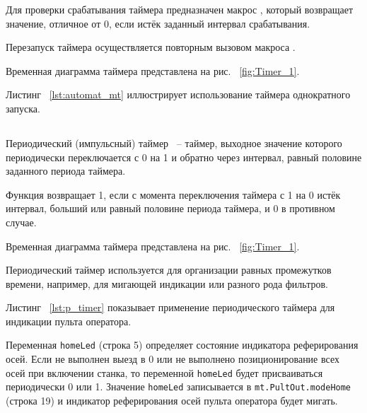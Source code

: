 Для проверки срабатывания таймера предназначен макрос , который возвращает значение, отличное от 0, если истёк заданный интервал срабатывания.

Перезапуск таймера осуществляется повторным вызовом макроса .

Временная диаграмма таймера представлена на рис. ~\ref{fig:Timer_1}.


Листинг ~\ref{lst:automat_mt} иллюстрирует использование таймера однократного запуска.


\subsection{}

Периодический (импульсный) таймер ~-- таймер, выходное значение которого периодически переключается с 0 на 1 и обратно через интервал, равный половине заданного периода таймера.

Функция  возвращает 1, если с момента переключения таймера с 1 на 0 истёк интервал, больший или равный половине периода таймера, и 0 в противном случае. 

Временная диаграмма таймера представлена на рис. ~\ref{fig:Timer_1}.


Периодический таймер используется для организации равных промежутков времени, например, для мигающей индикации или разного рода фильтров.

Листинг ~\ref{lst:p_timer} показывает применение периодического таймера для индикации пульта оператора.\killoverfullbefore 

Переменная \texttt{homeLed} (строка 5) определяет состояние индикатора реферирования осей. Если не выполнен выезд в 0 или не выполнено позиционирование всех осей при включении станка, то переменной \texttt{homeLed} будет присваиваться периодически 0 или 1. Значение \texttt{homeLed} записывается в \texttt{mt.PultOut.modeHome} (строка 19) и индикатор реферирования осей пульта оператора будет мигать. \killoverfullbefore \BL

